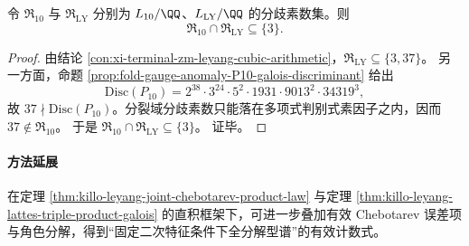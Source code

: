 \begin{proposition}[分歧素数集的硬分离与双分歧不可兼得]\label{prop:killo-leyang-ramification-hard-separation}
令 \(\mathfrak R_{10}\) 与 \(\mathfrak R_{\mathrm{LY}}\) 分别为 \(L_{10}/\QQ\)、\(L_{\mathrm{LY}}/\QQ\) 的分歧素数集。则
\[
\mathfrak R_{10}\cap \mathfrak R_{\mathrm{LY}}\subseteq \{3\}.
\]
\end{proposition}
\begin{proof}
由结论 \ref{con:xi-terminal-zm-leyang-cubic-arithmetic}，\(\mathfrak R_{\mathrm{LY}}\subseteq\{3,37\}\)。
另一方面，命题 \ref{prop:fold-gauge-anomaly-P10-galois-discriminant} 给出
\[
\mathrm{Disc}(P_{10})
=2^{38}\cdot 3^{24}\cdot 5^{2}\cdot 1931\cdot 9013^{2}\cdot 34319^{3},
\]
故 \(37\nmid \mathrm{Disc}(P_{10})\)。分裂域分歧素数只能落在多项式判别式素因子之内，因而 \(37\notin\mathfrak R_{10}\)。
于是
\(
\mathfrak R_{10}\cap \mathfrak R_{\mathrm{LY}}
\subseteq
\{3\}
\)。
证毕。
\end{proof}

\paragraph{方法延展}
在定理 \ref{thm:killo-leyang-joint-chebotarev-product-law} 与定理 \ref{thm:killo-leyang-lattes-triple-product-galois} 的直积框架下，可进一步叠加有效 Chebotarev 误差项与角色分解，得到“固定二次特征条件下全分解型谱”的有效计数式。
